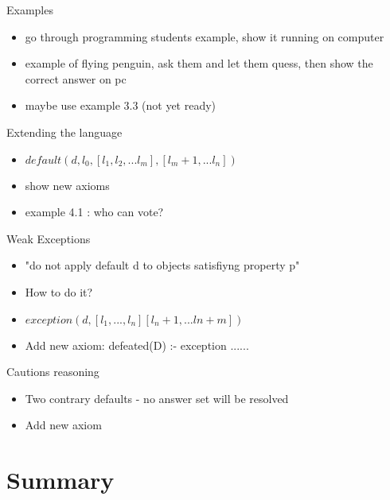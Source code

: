 \documentclass{beamer}
\begin{document}
  
  \begin{frame}{Examples}
    \begin{itemize}
      \item go through programming students example, show it running on computer
      \item example of flying penguin, ask them and let them quess,
        then show the correct answer on pc
      \item maybe use example 3.3 (not yet ready)
    \end{itemize}
  \end{frame}
  
  
  \begin{frame}{Extending the language}
    \begin{itemize}
      \item $default(d,l_0,[l_1, l_2, ... l_m], [l_m+1, ... l_n])$
      \item show new axioms
      \item example 4.1 : who can vote?
    \end{itemize}
  \end{frame}
  
  
  \begin{frame}{Weak Exceptions}
    \begin{itemize}
      \item "do not apply default d to objects satisfiyng property p" 
      \item How to do it?
      \item $exception(d, [l_1, ... ,l_n] [l_n+1,...ln+m])$
      \item Add new axiom: defeated(D) :- exception ......    
    \end{itemize}
  \end{frame}
  
  
  \begin{frame}{Cautions reasoning}
    \begin{itemize}
      \item Two contrary defaults - no answer set will be resolved
      \item Add new axiom
    \end{itemize}
  \end{frame}
  
  
  
  
  
\section*{Summary}
\end{document}
